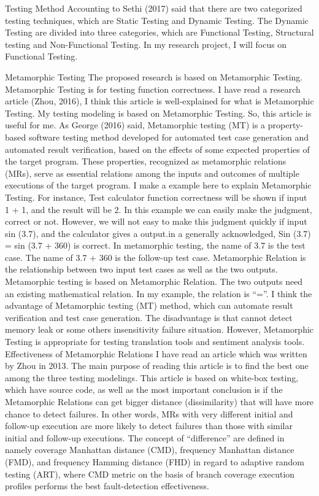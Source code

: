 \documentclass[conference]{IEEEtran}
\begin{document}
Testing Method
Accounting to Sethi (2017) said that there are two categorized testing techniques, which are Static Testing and Dynamic Testing. The Dynamic Testing are divided into three categories, which are Functional Testing, Structural testing and Non-Functional Testing. In my research project, I will focus on Functional Testing.

Metamorphic Testing
The proposed research is based on Metamorphic Testing. Metamorphic Testing is for testing function correctness. I have read a research article (Zhou, 2016), I think this article is well-explained for what is Metamorphic Testing. My testing modeling is based on Metamorphic Testing. So, this article is useful for me. As George (2016) said, Metamorphic testing (MT) is a property-based software testing method developed for automated test case generation and automated result verification, based on the effects of some expected properties of the target program. These properties, recognized as metamorphic relations (MRs), serve as essential relations among the inputs and outcomes of multiple executions of the target program. I make a example here to explain Metamorphic Testing. For instance, Test calculator function correctness will be shown if input 1 + 1, and the result will be 2. In this example we can easily make the judgment, correct or not. However, we will not easy to make this judgment quickly if input sin (3.7), and the calculator gives a output.in a generally acknowledged, Sin (3.7) = sin (3.7 + 360) is correct. In metamorphic testing, the name of 3.7 is the test case. The name of 3.7 + 360 is the follow-up test case. Metamorphic Relation is the relationship between two input test cases as well as the two outputs. Metamorphic testing is based on Metamorphic Relation. The two outputs need an existing mathematical relation. In my example, the relation is “=”. I think the advantage of Metamorphic testing (MT) method, which can automate result verification and test case generation. The disadvantage is that cannot detect memory leak or some others insensitivity failure situation. However, Metamorphic Testing is appropriate for testing translation tools and sentiment analysis tools.
Effectiveness of Metamorphic Relations
I have read an article which was written by Zhou in 2013. The main purpose of reading this article is to find the best one among the three testing modelings. This article is based on white-box testing, which have source code, as well as the most important conclusion is if the Metamorphic Relations can get bigger distance (dissimilarity) that will have more chance to detect failures.  In other words, MRs with very different initial and follow-up execution are more likely to detect failures than those with similar initial and follow-up executions. The concept of “difference” are defined in namely coverage Manhattan distance (CMD), frequency Manhattan distance (FMD), and frequency Hamming distance (FHD) in regard to adaptive random testing (ART), where CMD metric on the basis of branch coverage execution profiles performs the best fault-detection effectiveness.
\end{document}
